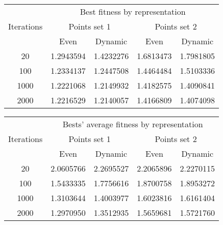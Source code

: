 \begin{center}
	\begin{tabular}{|c|c|c|c|c|}
		\hline
		\multirow{3}{*}{Iterations}	&	\multicolumn{4}{c|}{Best fitness by representation}	\\
										\cline{2-5}
									&	\multicolumn{2}{c|}{Points set 1}	& \multicolumn{2}{c|}{Points set 2} \\
										\cline{2-5}
									&	Even			&	Dynamic			&	Even			&	Dynamic		\\
		\hline								
		20							& 1.2943594 \cellcolor[gray]{0.9}		& 1.4232276			& 1.6813473 \cellcolor[gray]{0.9}		& 1.7981805		\\
		\hline
		100							& 1.2334137 \cellcolor[gray]{0.9}		& 1.2447508 		& 1.4464484 \cellcolor[gray]{0.9}		& 1.5103336		\\
		\hline
		1000						& 1.2221068 		& 1.2149932 \cellcolor[gray]{0.9}		& 1.4182575 		& 1.4090841	\cellcolor[gray]{0.9}	\\
		\hline
		2000						& 1.2216529 		& 1.2140057 \cellcolor[gray]{0.9}		& 1.4166809 		& 1.4074098	\cellcolor[gray]{0.9}	\\
		\hline
	\end{tabular}
	\label{tab:selection_type_best}
\end{center}

\begin{center}
	\begin{tabular}{|c|c|c|c|c|}
		\hline
		\multirow{3}{*}{Iterations}	&	\multicolumn{4}{c|}{Bests' average fitness by representation}	\\
										\cline{2-5}
									&	\multicolumn{2}{c|}{Points set 1}	& \multicolumn{2}{c|}{Points set 2} \\
										\cline{2-5}
									&	Even			&	Dynamic			&	Even			&	Dynamic		\\
	\hline								
	20								&	2.0605766  \cellcolor[gray]{0.9}		&	2.2695527		&	2.2065896  \cellcolor[gray]{0.9}		&	2.2270115	\\
	\hline
	100								&	1.5433335  \cellcolor[gray]{0.9}		&	1.7756616		&	1.8700758  \cellcolor[gray]{0.9}		&	1.8953272	\\
	\hline
	1000 							&	1.3103644  \cellcolor[gray]{0.9}		&	1.4003977		&	1.6023816  \cellcolor[gray]{0.9}		&	1.6161404	\\
	\hline
	2000							&	1.2970950  \cellcolor[gray]{0.9}		&	1.3512935		&	1.5659681  \cellcolor[gray]{0.9}		&	1.5721760	\\
	\hline
	\end{tabular}
	\label{tab:selection_type_best_avg}
\end{center}
